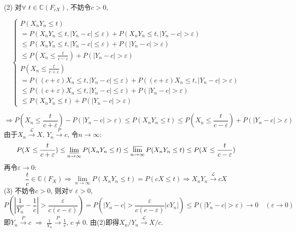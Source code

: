 \documentclass[standard]{ExBook}
\begin{document}
\begin{qitems}
    \begin{bbox}
(2) 对$\forall$ $t\in\mathbb{C}\left(F_{cX}\right)$, 不妨令$c>0$,
\vspace{-2em}
\begin{center}
\begin{equation}
    \left\{
    \begin{array}{l}
        \nonumber
        P(X_n Y_n\leq t)\\
        = P(X_n Y_n\leq t,|Y_n-c|\leq \varepsilon)+P(X_n Y_n\leq t,|Y_n-c|> \varepsilon)\\
        \leq P(X_n Y_n\leq t,|Y_n-c|\leq \varepsilon)+P(|Y_n-c|> \varepsilon)\\
        \leq P(X_n\leq\displaystyle\frac{t}{c-\varepsilon})+P(|Y_n-c|> \varepsilon)\\
        P(X_n\leq \displaystyle\frac{t}{c+\varepsilon})\\
        = P((c+\varepsilon)X_n\leq t,|Y_n-c|\leq \varepsilon)+P((c+\varepsilon)X_n\leq t,|Y_n-c|>\varepsilon)\\
        \leq P((c+\varepsilon)X_n\leq t,|Y_n-c|\leq \varepsilon)+P(|Y_n-c|>\varepsilon)\\
        \leq P(X_n Y_n\leq t)+P(|Y_n-c|>\varepsilon)
    \end{array}
    \right.
\end{equation}
\end{center}
$$\Longrightarrow P(X_n\leq \displaystyle\frac{t}{c+\varepsilon})-P(|Y_n-c|>\varepsilon) \leq P(X_n Y_n\leq t) \leq P(X_n\leq\displaystyle\frac{t}{c-\varepsilon})+P(|Y_n-c|> \varepsilon)$$
由于$X_n\xrightarrow{\mathcal{L}}X$, $Y_n\xrightarrow{P}c$, 令$n\to\infty$:
$$P(X\leq \displaystyle\frac{t}{c+\varepsilon}) \leq \varliminf\limits_{n\to\infty}P(X_n Y_n\leq t) \leq \varlimsup\limits_{n\to\infty}P(X_n Y_n\leq t) \leq P(X\leq\displaystyle\frac{t}{c-\varepsilon})$$
再令$\varepsilon\to0$:
$$\displaystyle\frac{t}{c}\in\mathbb{C}\left(F_{X}\right) \Longrightarrow \lim\limits_{n\to\infty}P(X_n Y_n\leq t)=P(cX\leq t) \Longrightarrow X_n Y_n\xrightarrow{\mathcal{L}}cX$$
(3) 不妨令$c>0$, 则对$\forall$ $\varepsilon>0$,
$$\displaystyle P\left(\left|\frac{1}{Y_n}-\frac{1}{c}\right|>\frac{\varepsilon}{c(c-\varepsilon)}\right)=P\left(\left|Y_n-c\right|>\frac{\varepsilon}{c(c-\varepsilon)}\left|c Y_n\right|\right) \leq P\left(\left|Y_n-c\right|>\varepsilon\right) \to 0 \quad (\varepsilon\to0)$$
即$Y_n\xrightarrow{P}c$ $\Longrightarrow$ $\displaystyle\frac{1}{Y_n}\xrightarrow{P}\frac{1}{c}$, $c\neq0$. 由(2)即得$X_n/Y_n\xrightarrow{\mathcal{L}}X/c$.
    \end{bbox}


\end{qitems}
\end{document}
